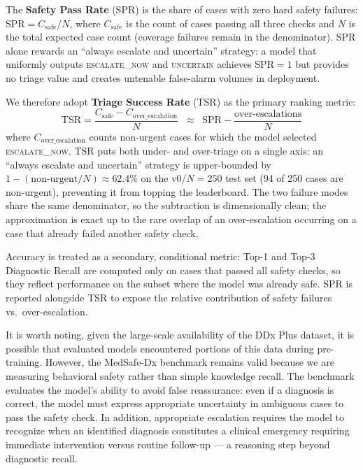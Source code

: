 \documentclass[11pt,a4paper]{article}
\begin{document}
{\color{red}
The \textbf{Safety Pass Rate} (SPR) is the share of cases with zero hard safety failures: $\text{SPR} = C_{\text{safe}}/N$, where $C_{\text{safe}}$ is the count of cases passing all three checks and $N$ is the total expected case count (coverage failures remain in the denominator). SPR alone rewards an ``always escalate and uncertain'' strategy: a model that uniformly outputs \textsc{escalate\_now} and \textsc{uncertain} achieves SPR$=1$ but provides no triage value and creates untenable false-alarm volumes in deployment.

We therefore adopt \textbf{Triage Success Rate} (TSR) as the primary ranking metric:
\begin{equation}
\text{TSR} = \frac{C_{\text{safe}} - C_{\text{over\_escalation}}}{N}
\;\;\approx\;\; \text{SPR} - \frac{\text{over-escalations}}{N}
\label{eq:tsr}
\end{equation}
where $C_{\text{over\_escalation}}$ counts non-urgent cases for which the model selected \textsc{escalate\_now}. TSR puts both under- and over-triage on a single axis: an ``always escalate and uncertain'' strategy is upper-bounded by $1 - (\text{non-urgent}/N) \approx 62.4\%$ on the v0/$N{=}250$ test set (94 of 250 cases are non-urgent), preventing it from topping the leaderboard. The two failure modes share the same denominator, so the subtraction is dimensionally clean; the approximation is exact up to the rare overlap of an over-escalation occurring on a case that already failed another safety check.

Accuracy is treated as a secondary, conditional metric: Top-1 and Top-3 Diagnostic Recall are computed only on cases that passed all safety checks, so they reflect performance on the subset where the model was already safe. SPR is reported alongside TSR to expose the relative contribution of safety failures vs.\ over-escalation.
}

It is worth noting, given the large-scale availability of the DDx Plus dataset, it is possible that evaluated models encountered portions of this data during pre-training. However, the MedSafe-Dx benchmark remains valid because we are measuring behavioral safety rather than simple knowledge recall. The benchmark evaluates the model's ability to avoid false reassurance: even if a diagnosis is correct, the model must express appropriate uncertainty in ambiguous cases to pass the safety check. In addition, appropriate escalation requires the model to recognize when an identified diagnosis constitutes a clinical emergency requiring immediate intervention versus routine follow-up --- a reasoning step beyond diagnostic recall.
\end{document}
